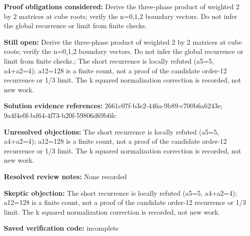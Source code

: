 \documentclass[11pt]{article}
\begin{document}
\textbf{Proof obligations considered:} Derive the three-phase product of weighted 2 by 2 matrices at cube roots; verify the n=0,1,2 boundary vectors. Do not infer the global recurrence or limit from finite checks.\par
\textbf{Still open:} Derive the three-phase product of weighted 2 by 2 matrices at cube roots; verify the n=0,1,2 boundary vectors. Do not infer the global recurrence or limit from finite checks.; The short recurrence is locally refuted (a5=5, a4+a2=4); a12=128 is a finite count, not a proof of the candidate order-12 recurrence or 1/3 limit. The k squared normalization correction is recorded, not new work.\par
\textbf{Solution evidence references:} 2661c07f-b3e2-446a-9b89-c700b6a6243e; 9a4f4e0f-bd64-4f73-b20f-59806d69b6fc\par
\textbf{Unresolved objections:} The short recurrence is locally refuted (a5=5, a4+a2=4); a12=128 is a finite count, not a proof of the candidate order-12 recurrence or 1/3 limit. The k squared normalization correction is recorded, not new work.\par
\textbf{Resolved review notes:} None recorded\par
\textbf{Skeptic objection:} The short recurrence is locally refuted (a5=5, a4+a2=4); a12=128 is a finite count, not a proof of the candidate order-12 recurrence or 1/3 limit. The k squared normalization correction is recorded, not new work.\par
\textbf{Saved verification code:} incomplete\par
\end{document}
